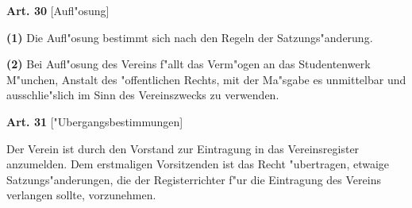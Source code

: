 \documentclass[12pt]{article}
\newcommand{\Satz}[2]{

\begin{samepage}
{\bf (#1)} #2
\end{samepage}
}
\newenvironment{Artikel}[2]{
\bigskip \centerline{{\bf Art. #1} [#2]}
\nopagebreak
}{
}
\begin{document}
\begin{Artikel}{30}{Aufl"osung}

\Satz{1}{Die Aufl"osung bestimmt sich nach den Regeln der Satzungs"anderung.}

\Satz{2}{Bei Aufl"osung des Vereins f"allt das 
Verm"ogen an das Studentenwerk M"unchen, Anstalt 
des "offentlichen Rechts, mit der Ma"sgabe es unmittelbar und 
ausschlie"slich im Sinn des Vereinszwecks zu verwenden.}

\end{Artikel}

\begin{Artikel}{31}{"Ubergangsbestimmungen}

Der Verein ist durch den Vorstand zur Eintragung in das Vereinsregister 
anzumelden. Dem erstmaligen Vorsitzenden ist das Recht "ubertragen,
etwaige Satzungs"anderungen, die der Registerrichter f"ur die Eintragung
des Vereins verlangen sollte, vorzunehmen. 

\end{Artikel}
\end{document}
